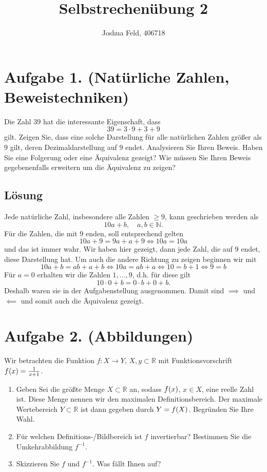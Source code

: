 \documentclass[german,12pt]{homework}
\title{Selbstrechenübung 2}
\author{Joshua Feld, 406718}
\institute{RWTH Aachen University\\Center for Computational Engineering Science}
\newcommand{\NN}{\mathbb{N}}
\newcommand{\RR}{\mathbb{R}}
\DeclarePairedDelimiter{\enbrace}{(}{)}
\begin{document}
    \maketitle

    \section*{Aufgabe 1. (Natürliche Zahlen, Beweistechniken)}

    \begin{problem}
        Die Zahl \(39\) hat die interessante Eigenschaft, dass
        \[39 = 3 \cdot 9 + 3 + 9\]
        gilt. Zeigen Sie, dass eine solche Darstellung für alle natürlichen Zahlen größer als \(9\) gilt, deren Dezimaldarstellung auf \(9\) endet. Analysieren Sie Ihren Beweis. Haben Sie eine Folgerung oder eine Äquivalenz gezeigt? Wie müssen Sie Ihren Beweis gegebenenfalls erweitern um die Äquivalenz zu zeigen?
    \end{problem}

    \subsection*{Lösung} Jede natürliche Zahl, insbesondere alle Zahlen \(\ge 9\), kann geschrieben werden als
    \[10a + b, \quad a, b \in \NN.\]
    Für die Zahlen, die mit \(9\) enden, soll entsprechend gelten
    \[10a + 9 = 9a + a + 9 \iff 10a = 10a\]
    und das ist immer wahr.  Wir haben hier gezeigt, dann jede Zahl, die auf \(9\) endet, diese Darstellung hat. Um auch die andere Richtung zu zeigen beginnen wir mit
    \[10a + b = ab + a + b \iff 10a = ab + a \iff 10 = b + 1 \iff 9 = b\]
    Für \(a = 0\) erhalten wir die Zahlen \(1, \ldots, 9\), d.h. für diese gilt
    \[10 \cdot 0 + b = 0 \cdot b + 0 + b.\]
    Deshalb waren sie in der Aufgabenstellung ausgenommen. Damit sind \(\implies\) und \(\impliedby\) und somit auch die Äquivalenz gezeigt.

    \section*{Aufgabe 2. (Abbildungen)}

    \begin{problem}
        Wir betrachten die Funktion \(f: X \to Y\), \(X, y \subset \RR\) mit Funktionsvorschrift \(f\enbrace*{x} = \frac{1}{x + 1}\).
        \begin{enumerate}
            \item Geben Sei die größte Menge \(X \subset \RR\) an, sodass \(f\enbrace*{x}\), \(x \in X\), eine reelle Zahl ist. Diese Menge nennen wir den maximalen Definitionsbereich. Der maximale Wertebereich \(Y \subset \RR\) ist dann gegeben durch \(Y = f\enbrace*{X}\). Begründen Sie Ihre Wahl.
            \item Für welchen Definitions-/Bildbereich ist \(f\) invertierbar? Bestimmen Sie die Umkehrabbildung \(f^{-1}\).
            \item Skizzieren Sie \(f\) und \(f^{-1}\). Was fällt Ihnen auf?
        \end{enumerate}
    \end{problem}
\end{document}
